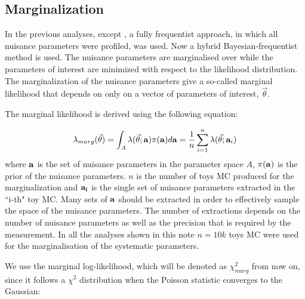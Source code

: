 
\subsection {Marginalization}
\label{sec:marginalization}

In the previous analyses,
except \cite{OurRun56AntiNueBarAppearanceAnalysis3Flavour},
 a fully frequentist approach, in which all nuisance parameters were profiled, was used.
Now a hybrid Bayesian-frequentist method is used. 
The nuisance parameters are marginalised over while the parameters of interest are minimized with respect to the likelihood distribution.
The marginalization of the nuisance parameters give a so-called marginal likelihood that depends on only
on a vector of parameters of interest, $\vec{\theta}$.

The marginal likelihood is derived using the following equation:

\begin{equation}\label{eq:likemarg}
\lambda_{marg} (\vec{\theta}) = \int_{A} \lambda (\vec{\theta};{\bf a}) \pi{({\bf a})} d {\bf a} = \frac{1}{n} \sum_{i=1}^{n} 
\lambda (\vec{\theta}; {\bf a}_i) 
\end{equation}
where ${\bf a}$ is the set of nuisance parameters in the parameter space $A$, $\pi{({\bf a})}$ is the prior of the nuisance parameters.
$n$ is the number of toys MC produced for the marginalization and
${\bf a_i}$ is the single set of nuisance parameters extracted in the ``i-th" toy MC.
Many sets of ${\bf a}$ should be extracted in order to effectively sample the space of the nuisance parameters.
The number of extractions depends on the number of nuisance parameters as well as the precision that is required by the measurement.
In all the analyses shown in this note $n = 10k$ toys MC were used for the marginalisation of the systematic parameters.

We use the marginal log-likelihood, which will be denoted as $\chi^2_{marg}$ from now on,
since it follows a $\chi^2$ distribution when the Poisson statistic converges to the Gaussian:

